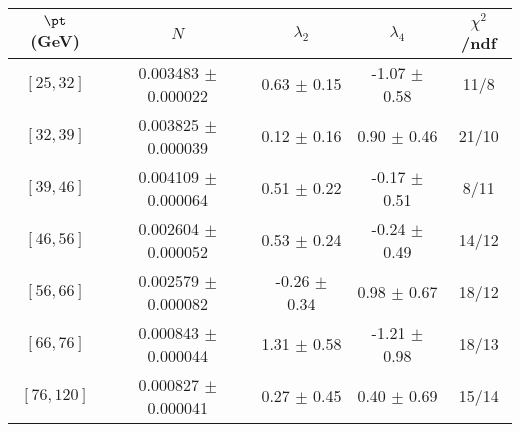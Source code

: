 \begin{tabular}{c||c|c|c|c}
$\pt$ (GeV) & $N$ & $\lambda_{2}$ & $\lambda_4$  & $\chi^2$/ndf  \\
\hline
$[25, 32]$ & 0.003483 $\pm$ 0.000022 & 0.63 $\pm$ 0.15 & -1.07 $\pm$ 0.58 & 11/8\\
$[32, 39]$ & 0.003825 $\pm$ 0.000039 & 0.12 $\pm$ 0.16 & 0.90 $\pm$ 0.46 & 21/10\\
$[39, 46]$ & 0.004109 $\pm$ 0.000064 & 0.51 $\pm$ 0.22 & -0.17 $\pm$ 0.51 & 8/11\\
$[46, 56]$ & 0.002604 $\pm$ 0.000052 & 0.53 $\pm$ 0.24 & -0.24 $\pm$ 0.49 & 14/12\\
$[56, 66]$ & 0.002579 $\pm$ 0.000082 & -0.26 $\pm$ 0.34 & 0.98 $\pm$ 0.67 & 18/12\\
$[66, 76]$ & 0.000843 $\pm$ 0.000044 & 1.31 $\pm$ 0.58 & -1.21 $\pm$ 0.98 & 18/13\\
$[76, 120]$ & 0.000827 $\pm$ 0.000041 & 0.27 $\pm$ 0.45 & 0.40 $\pm$ 0.69 & 15/14\\
\end{tabular}
